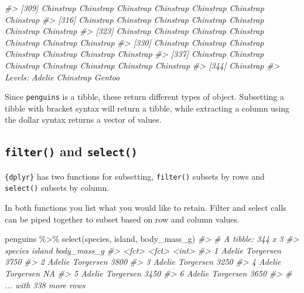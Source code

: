 \documentclass[
  12pt,
]{book}
\newenvironment{Shaded}{\begin{snugshade}}{\end{snugshade}}
\newcommand{\CommentTok}[1]{\textcolor[rgb]{0.56,0.35,0.01}{\textit{#1}}}
\newcommand{\FunctionTok}[1]{\textcolor[rgb]{0.00,0.00,0.00}{#1}}
\newcommand{\NormalTok}[1]{#1}
\newcommand{\SpecialCharTok}[1]{\textcolor[rgb]{0.00,0.00,0.00}{#1}}
\begin{document}
\begin{Shaded}
\begin{Highlighting}[]
\CommentTok{\#\textgreater{} [309] Chinstrap Chinstrap Chinstrap Chinstrap Chinstrap Chinstrap Chinstrap}
\CommentTok{\#\textgreater{} [316] Chinstrap Chinstrap Chinstrap Chinstrap Chinstrap Chinstrap Chinstrap}
\CommentTok{\#\textgreater{} [323] Chinstrap Chinstrap Chinstrap Chinstrap Chinstrap Chinstrap Chinstrap}
\CommentTok{\#\textgreater{} [330] Chinstrap Chinstrap Chinstrap Chinstrap Chinstrap Chinstrap Chinstrap}
\CommentTok{\#\textgreater{} [337] Chinstrap Chinstrap Chinstrap Chinstrap Chinstrap Chinstrap Chinstrap}
\CommentTok{\#\textgreater{} [344] Chinstrap}
\CommentTok{\#\textgreater{} Levels: Adelie Chinstrap Gentoo}
\end{Highlighting}
\end{Shaded}

Since \texttt{penguins} is a tibble, these return different types of object. Subsetting a tibble with bracket syntax will return a tibble, while extracting a column using the dollar syntax returns a vector of values.

\hypertarget{filter-and-select}{%
\subsection{\texorpdfstring{\texttt{filter()} and \texttt{select()}}{filter() and select()}}\label{filter-and-select}}

\texttt{\{dplyr\}} has two functions for subsetting, \texttt{filter()} subsets by rows and \texttt{select()} subsets by column.

In both functions you list what you would like to retain. Filter and select calls can be piped together to subset based on row and column values.

\begin{Shaded}
\begin{Highlighting}[]
\NormalTok{penguins }\SpecialCharTok{\%\textgreater{}\%} 
  \FunctionTok{select}\NormalTok{(species, island, body\_mass\_g)}
\CommentTok{\#\textgreater{} \# A tibble: 344 x 3}
\CommentTok{\#\textgreater{}   species island    body\_mass\_g}
\CommentTok{\#\textgreater{}   \textless{}fct\textgreater{}   \textless{}fct\textgreater{}           \textless{}int\textgreater{}}
\CommentTok{\#\textgreater{} 1 Adelie  Torgersen        3750}
\CommentTok{\#\textgreater{} 2 Adelie  Torgersen        3800}
\CommentTok{\#\textgreater{} 3 Adelie  Torgersen        3250}
\CommentTok{\#\textgreater{} 4 Adelie  Torgersen          NA}
\CommentTok{\#\textgreater{} 5 Adelie  Torgersen        3450}
\CommentTok{\#\textgreater{} 6 Adelie  Torgersen        3650}
\CommentTok{\#\textgreater{} \# ... with 338 more rows}
\end{Highlighting}
\end{Shaded}
\end{document}
